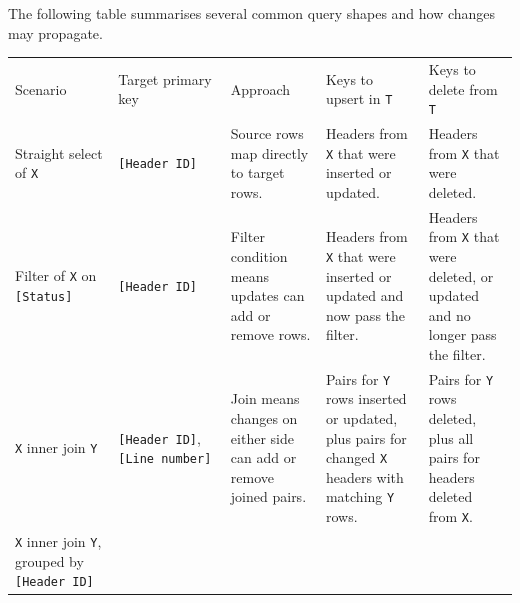 \documentclass[10pt,openany,10pt]{book}
\newcounter{none}
\let\podeToprule\toprule
\let\podeMidrule\midrule
\let\podeBottomrule\bottomrule
\renewcommand{\toprule}{\arrayrulecolor{pbiGrid}\podeToprule}
\renewcommand{\midrule}{\arrayrulecolor{pbiGrid}\podeMidrule}
\renewcommand{\bottomrule}{\arrayrulecolor{pbiGrid}\podeBottomrule}
\begin{document}
The following table summarises several common query shapes and how
changes may propagate.

{\def\LTcaptype{none} %
\begin{longtable}[]{@{}
  >{\raggedright\arraybackslash}p{}
  >{\raggedright\arraybackslash}p{}
  >{\raggedright\arraybackslash}p{}
  >{\raggedright\arraybackslash}p{}
  >{\raggedright\arraybackslash}p{}@{}}
\toprule\noalign{}
\begin{minipage}[b]{\linewidth}\raggedright
Scenario
\end{minipage} & \begin{minipage}[b]{\linewidth}\raggedright
Target primary key
\end{minipage} & \begin{minipage}[b]{\linewidth}\raggedright
Approach
\end{minipage} & \begin{minipage}[b]{\linewidth}\raggedright
Keys to upsert in \texttt{T}
\end{minipage} & \begin{minipage}[b]{\linewidth}\raggedright
Keys to delete from \texttt{T}
\end{minipage} \\
\midrule\noalign{}
\endhead
\bottomrule\noalign{}
\endlastfoot
Straight select of \texttt{X} & \texttt{{[}Header\ ID{]}} & Source rows
map directly to target rows. & Headers from \texttt{X} that were
inserted or updated. & Headers from \texttt{X} that were deleted. \\
Filter of \texttt{X} on \texttt{{[}Status{]}} &
\texttt{{[}Header\ ID{]}} & Filter condition means updates can add or
remove rows. & Headers from \texttt{X} that were inserted or updated and
now pass the filter. & Headers from \texttt{X} that were deleted, or
updated and no longer pass the filter. \\
\texttt{X} inner join \texttt{Y} & \texttt{{[}Header\ ID{]}},
\texttt{{[}Line\ number{]}} & Join means changes on either side can add
or remove joined pairs. & Pairs for \texttt{Y} rows inserted or updated,
plus pairs for changed \texttt{X} headers with matching \texttt{Y} rows.
& Pairs for \texttt{Y} rows deleted, plus all pairs for headers deleted
from \texttt{X}. \\
\texttt{X} inner join \texttt{Y}, grouped by \texttt{{[}Header\ ID{]}} &

\end{longtable}}
\end{document}
